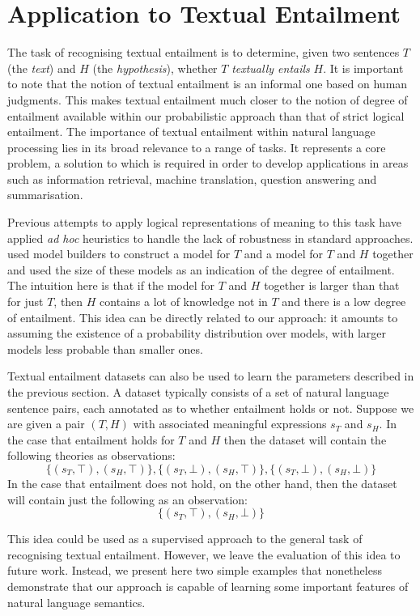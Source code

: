 \documentclass[letterpaper]{article}
\newcommand{\citet}[1]{\newcite{#1}}
\begin{document}
\section{Application to Textual Entailment}

The task of recognising textual entailment \cite{Dagan:05} is to
determine, given two sentences $T$ (the \emph{text}) and $H$ (the
\emph{hypothesis}), whether $T$ {\em textually entails\/} $H$. It is important to note that the notion of
textual entailment is an informal one based on human judgments. This makes textual entailment much closer to the notion of degree of entailment available within our probabilistic approach than that of strict logical entailment.  The importance of textual entailment within natural language processing lies in its broad relevance to a range of tasks. It represents a core problem, a solution to which is required in order to develop applications in areas such as
information retrieval, machine translation, question answering and
summarisation.

Previous attempts to apply logical representations of meaning to this
task have applied {\em ad hoc\/} heuristics to handle the lack of robustness in
standard approaches. \citet{Bos:06} used model builders to construct a
model for $T$ and a model for $T$ and $H$ together and used the size
of these models as an indication of the degree of entailment. The
intuition here is that if the model for $T$ and $H$ together is larger
than that for just $T$, then $H$ contains a lot of knowledge not in
$T$ and there is a low degree of entailment.  This idea can be
directly related to our approach: it amounts to assuming the existence of a probability
distribution over models,
with larger models less probable than smaller ones.

Textual entailment datasets can also be used to learn the parameters
described in the previous section. A dataset typically consists of a
set of natural language sentence pairs, each annotated as to whether
entailment holds or not. Suppose we are given a pair $(T,H)$ with associated meaningful expressions $s_T$ and $s_H$. In the case that entailment holds for $T$ and $H$ then the dataset will contain the following theories as observations:
\[
\{(s_T,\top),(s_H,\top)\}, \{(s_T,\bot),(s_H,\top)\},\{(s_T,\bot),(s_H,\bot)\}
\]
In the case that entailment does not hold, on the other hand, then the dataset will contain just the following as an observation:
\[
\{(s_T,\top),(s_H,\bot)\}
\]

This
idea could be used as a supervised approach to the general task of recognising textual
entailment.  However, we leave the evaluation of this idea to future
work. Instead, we present here two simple examples that nonetheless demonstrate that our
approach is capable of learning some important features of natural
language semantics.
\end{document}
